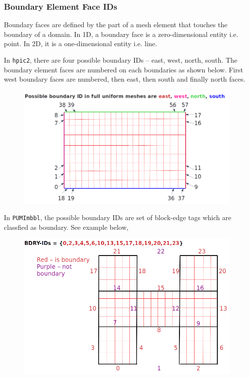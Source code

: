 \documentclass[a4paper,12pt]{article}
\begin{document}
\subsubsection{Boundary Element Face IDs}
Boundary faces are defined by the part of a mesh element that touches the boundary of a domain. In 1D, a boundary face is a zero-dimensional entity i.e. point. In 2D, it is a one-dimensional entity i.e. line. 

In \texttt{hpic2}, there are four possible boundary IDs -- east, west, north, south. The boundary element faces are numbered on each boundaries as shown below. First west boundary faces are numbered, then east, then south and finally north faces.  
\begin{figure}[H]
	\centering
	\includegraphics[scale=0.4]{figures/hpic2_bdry_face.png}
\end{figure}

In \texttt{PUMImbbl}, the possible boundary IDs are set of block-edge tags which are classfied as boundary. See example below,
\begin{figure}[H]
	\centering
	\includegraphics[scale=0.4]{figures/BdryIDs.png}
\end{figure}
\end{document}
